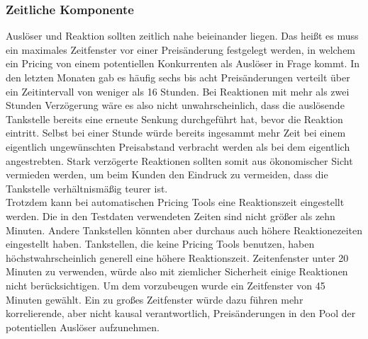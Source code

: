 \documentclass[12pt,a4paper,bibliography=totocnumbered,listof=totocnumbered]{scrartcl}
\begin{document}
\subsubsection{Zeitliche Komponente}
Auslöser und Reaktion sollten zeitlich nahe beieinander liegen. Das heißt es muss ein maximales Zeitfenster vor einer Preisänderung festgelegt werden, in welchem ein Pricing von einem potentiellen Konkurrenten als Auslöser in Frage kommt. In den letzten Monaten gab es häufig sechs bis acht Preisänderungen verteilt über ein Zeitintervall von weniger als 16 Stunden. Bei Reaktionen mit mehr als zwei Stunden Verzögerung wäre es also nicht unwahrscheinlich, dass die auslösende Tankstelle bereits eine erneute Senkung durchgeführt hat, bevor die Reaktion eintritt. Selbst bei einer Stunde würde bereits ingesammt mehr Zeit bei einem eigentlich ungewünschten Preisabstand verbracht werden als bei dem eigentlich angestrebten. Stark verzögerte Reaktionen sollten somit aus ökonomischer Sicht vermieden werden, um beim Kunden den Eindruck zu vermeiden, dass die Tankstelle verhältnismäßig teurer ist.\\
Trotzdem kann bei automatischen Pricing Tools eine Reaktionszeit eingestellt werden. Die in den Testdaten verwendeten Zeiten sind nicht größer als zehn Minuten. Andere Tankstellen könnten aber durchaus auch höhere Reaktionezeiten eingestellt haben. Tankstellen, die keine Pricing Tools benutzen, haben höchstwahrscheinlich generell eine höhere Reaktionszeit. Zeitenfenster unter 20 Minuten zu verwenden, würde also mit ziemlicher Sicherheit einige Reaktionen nicht berücksichtigen. Um dem vorzubeugen wurde ein Zeitfenster von 45 Minuten gewählt. Ein zu großes Zeitfenster würde dazu führen mehr korrelierende, aber nicht kausal verantwortlich, Preisänderungen in den Pool der potentiellen Auslöser aufzunehmen.

\end{document}
